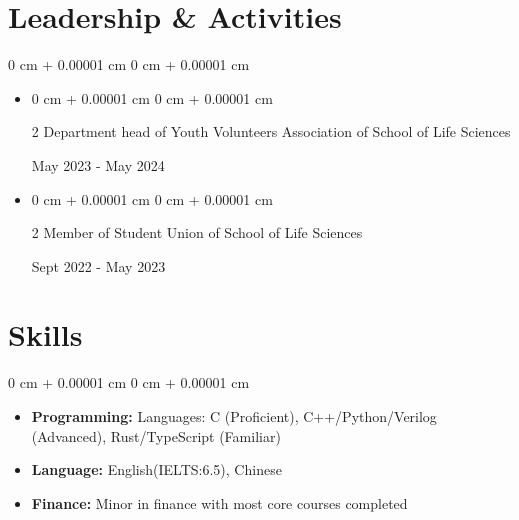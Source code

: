 \documentclass[10pt, letterpaper]{article}
\newenvironment{highlights}{
    \begin{itemize}[
        topsep=0.10 cm,
        parsep=0.10 cm,
        partopsep=0pt,
        itemsep=0pt,
        leftmargin=0 cm + 10pt
    ]
}{
    \end{itemize}
} %
\newenvironment{onecolentry}{
    \begin{adjustwidth}{
        0 cm + 0.00001 cm
    }{
        0 cm + 0.00001 cm
    }
}{
    \end{adjustwidth}
} %
\newenvironment{twocolentry}[2][]{
    \onecolentry
    \def\secondColumn{#2}
    \setcolumnwidth{\fill, 3.95 cm}
    \begin{paracol}{2}
}{
    \switchcolumn \raggedleft \secondColumn
    \end{paracol}
    \endonecolentry
} %
\begin{document}
    \section{Leadership \& Activities}
        \vspace{0.10 cm}
        \begin{onecolentry}
            \begin{highlights}
                \item \begin{twocolentry}
                    {May 2023 - May 2024} {Department head of Youth Volunteers Association of School of Life Sciences}
                \end{twocolentry}
                \item \begin{twocolentry}
                    {Sept 2022 - May 2023} {Member of Student Union of School of Life Sciences}
                \end{twocolentry}
            \end{highlights}
        \end{onecolentry}

    \section{Skills}
        \vspace{0.10 cm}
        \begin{onecolentry}
            \begin{highlights}
                \item \textbf{Programming:} Languages: C (Proficient), C++/Python/Verilog (Advanced), Rust/TypeScript (Familiar)
                \item \textbf{Language:} English(IELTS:6.5), Chinese
                \item \textbf{Finance:} Minor in finance with most core courses completed
            \end{highlights}
        \end{onecolentry}
\end{document}
